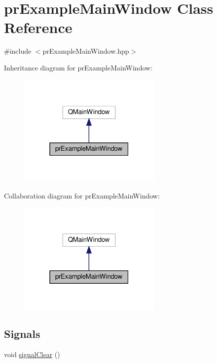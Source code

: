 \hypertarget{classpr_example_main_window}{}\section{pr\+Example\+Main\+Window Class Reference}
\label{classpr_example_main_window}


{\ttfamily \#include $<$pr\+Example\+Main\+Window.\+hpp$>$}



Inheritance diagram for pr\+Example\+Main\+Window\+:\nopagebreak
\begin{figure}[H]
\begin{center}
\leavevmode
\includegraphics[width=199pt]{classpr_example_main_window__inherit__graph}
\end{center}
\end{figure}


Collaboration diagram for pr\+Example\+Main\+Window\+:\nopagebreak
\begin{figure}[H]
\begin{center}
\leavevmode
\includegraphics[width=199pt]{classpr_example_main_window__coll__graph}
\end{center}
\end{figure}
\subsection*{Signals}
\begin{DoxyCompactItemize}
\item 
void \hyperlink{classpr_example_main_window_a46ef47aff2d6b2b511b24ceada6bbb20}{signal\+Clear} ()
\end{DoxyCompactItemize}
